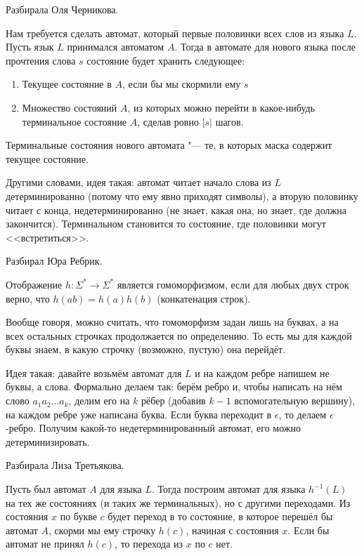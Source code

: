 	Разбирала Оля Черникова.

	Нам требуется сделать автомат, который первые половинки всех слов из языка $L$.
	Пусть язык $L$ принимался автоматом $A$.
	Тогда в автомате для нового языка после прочтения слова $s$ состояние будет хранить следующее:
	\begin{enumerate}
		\item Текущее состояние в $A$, если бы мы скормили ему $s$
		\item Множество состояний $A$, из которых можно перейти в какое-нибудь терминальное состояние $A$, сделав ровно $|s|$ шагов.
	\end{enumerate}
	Терминальные состояния нового автомата "--- те, в которых маска содержит текущее состояние.

	Другими словами, идея такая: автомат читает начало слова из $L$ детерминированно (потому что ему явно приходят символы),
	а вторую половинку читает с конца, недетерминированно (не знает, какая она, но знает, где должна закончится).
	Терминальном становится то состояние, где половинки могут <<встретиться>>.

	Разбирал Юра Ребрик.
	
	\begin{Def}
		Отображение $h \colon \Sigma^* \to \Sigma^* $ является гомоморфизмом, если для любых двух строк верно,
		что $h(ab)=h(a)h(b)$ (конкатенация строк).
	\end{Def}
	\begin{Rem}
		Вообще говоря, можно считать, что гомоморфизм задан лишь на буквах, а на всех остальных строчках продолжается по определению.
		То есть мы для каждой буквы знаем, в какую строчку (возможно, пустую) она перейдёт.
	\end{Rem}

	Идея такая: давайте возьмём автомат для $L$ и на каждом ребре напишем не буквы, а слова.
	Формально делаем так: берём ребро и, чтобы написать на нём слово $a_1a_2\dots a_k$, делим его на $k$ рёбер
	(добавив $k-1$ вспомогательную вершину), на каждом ребре уже написана буква.
	Если буква переходит в $\epsilon$, то делаем $\epsilon$-ребро.
	Получим какой-то недетерминированный автомат, его можно детерминизировать.

	Разбирала Лиза Третьякова.
	
	Пусть был автомат $A$ для языка $L$.
	Тогда построим автомат для языка $h^{-1}(L)$ на тех же состояниях (и таких же терминальных), но с другими переходами.
	Из состояния $x$ по букве $c$ будет переход в то состояние, в которое перешёл бы автомат $A$, скорми
	мы ему строчку $h(c)$, начиная с состояния $x$.
	Если бы автомат не принял $h(c)$, то перехода из $x$ по $c$ нет.

